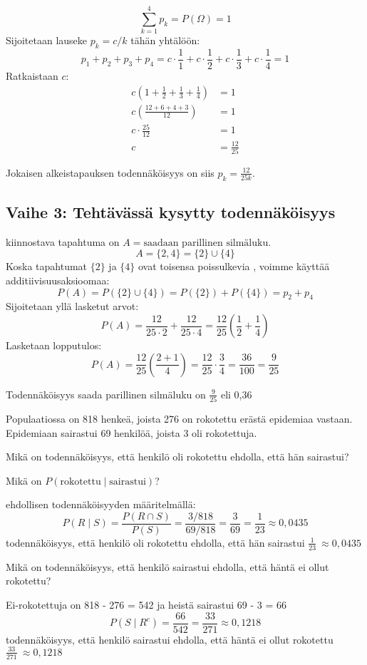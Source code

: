 \documentclass[12pt,a4paper]{article}
\begin{document}
\[
\sum_{k=1}^{4} p_k = P(\Omega) = 1
\]
Sijoitetaan lauseke $p_k = c/k$ tähän yhtälöön:
\[
p_1 + p_2 + p_3 + p_4 = c \cdot \frac{1}{1} + c \cdot \frac{1}{2} + c \cdot \frac{1}{3} + c \cdot \frac{1}{4} = 1
\]
Ratkaistaan $c$:
\begin{align*}
    c \left( 1 + \frac{1}{2} + \frac{1}{3} + \frac{1}{4} \right) &= 1 \\
    c \left( \frac{12+6+4+3}{12} \right) &= 1 \\
    c \cdot \frac{25}{12} &= 1 \\
    c &= \frac{12}{25}
\end{align*}

Jokaisen alkeistapauksen todennäköisyys on siis $p_k = \frac{12}{25k}$.

\pagebreak
\subsection*{Vaihe 3: Tehtävässä kysytty todennäköisyys}
kiinnostava tapahtuma on $A = \text{saadaan parillinen silmäluku}$.
\[
A = \{2, 4\} = \{2\} \cup \{4\}
\]
Koska tapahtumat $\{2\}$ ja $\{4\}$ ovat toisensa poissulkevia ,
voimme käyttää additiivisuusaksioomaa:
\[
P(A) = P(\{2\} \cup \{4\}) = P(\{2\}) + P(\{4\}) = p_2 + p_4
\]
Sijoitetaan yllä lasketut arvot:
\[
P(A) = \frac{12}{25 \cdot 2} + \frac{12}{25 \cdot 4} = \frac{12}{25} \left( \frac{1}{2} + \frac{1}{4} \right)
\]
Lasketaan lopputulos:
\[
P(A) = \frac{12}{25} \left( \frac{2+1}{4} \right) = \frac{12}{25} \cdot \frac{3}{4} = \frac{36}{100} = \frac{9}{25}
\]

Todennäköisyys saada parillinen silmäluku on $\displaystyle \frac{9}{25}$ eli 0,36







\pagebreak
{}
Populaatiossa on 818 henkeä, joista 276 on rokotettu erästä epidemiaa vastaan. Epidemiaan sairastui 69 henkilöä, joista 3 oli rokotettuja.

\begin{kohta}
  \item Mikä on todennäköisyys, että henkilö oli rokotettu ehdolla, että hän sairastui?
  
  Mikä on $P(\text{rokotettu}\mid \text{sairastui})$?

  ehdollisen todennäköisyyden määritelmällä:
  \[
  P(R\mid S)=\frac{P(R\cap S)}{P(S)}
  =\frac{3/818}{69/818}=\frac{3}{69}=\frac{1}{23}\approx 0,0435
  \]
  todennäköisyys, että henkilö oli rokotettu ehdolla, että hän sairastui $\displaystyle \frac{1}{23}\ \approx 0,0435$

  \item Mikä on todennäköisyys, että henkilö sairastui ehdolla, että häntä ei ollut rokotettu?

  Ei-rokotettuja on 818 - 276 = 542 ja heistä sairastui 69 - 3 = 66
  \[
  P(S\mid R^c)
  =\frac{66}{542}=\frac{33}{271}\approx 0{,}1218
  \]
 todennäköisyys, että henkilö sairastui ehdolla, että häntä ei ollut rokotettu $\displaystyle \frac{33}{271}\ \approx 0{,}1218$
\end{kohta}
\end{document}
